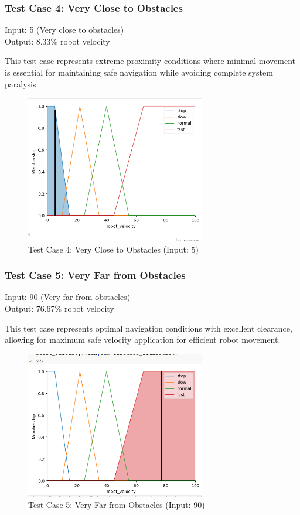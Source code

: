 \documentclass[11pt,a4paper]{article}
\begin{document}
\subsubsection{Test Case 4: Very Close to Obstacles}
Input: 5 (Very close to obstacles) \\
Output: 8.33\% robot velocity

This test case represents extreme proximity conditions where minimal movement is essential for maintaining safe navigation while avoiding complete system paralysis.

\begin{figure}[H]
\centering
\includegraphics[width=0.7\textwidth]{plots/test4.png}
\caption{Test Case 4: Very Close to Obstacles (Input: 5)}
\end{figure}

\subsubsection{Test Case 5: Very Far from Obstacles}
Input: 90 (Very far from obstacles) \\
Output: 76.67\% robot velocity

This test case represents optimal navigation conditions with excellent clearance, allowing for maximum safe velocity application for efficient robot movement.

\begin{figure}[H]
\centering
\includegraphics[width=0.7\textwidth]{plots/test5.png}
\caption{Test Case 5: Very Far from Obstacles (Input: 90)}
\end{figure}
\end{document}
